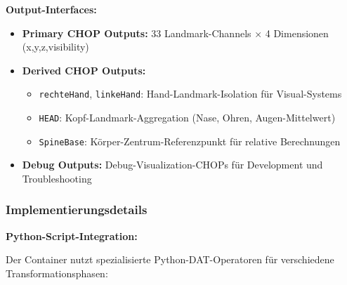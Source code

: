 \textbf{Output-Interfaces:}
\begin{itemize}
    \item \textbf{Primary CHOP Outputs:} 33 Landmark-Channels × 4 Dimensionen (x,y,z,visibility)
    \item \textbf{Derived CHOP Outputs:} 
    \begin{itemize}
        \item \texttt{rechteHand}, \texttt{linkeHand}: Hand-Landmark-Isolation für Visual-Systems
        \item \texttt{HEAD}: Kopf-Landmark-Aggregation (Nase, Ohren, Augen-Mittelwert)
        \item \texttt{SpineBase}: Körper-Zentrum-Referenzpunkt für relative Berechnungen
    \end{itemize}
    \item \textbf{Debug Outputs:} Debug-Visualization-CHOPs für Development und Troubleshooting
\end{itemize}

\subsubsection{Implementierungsdetails}

\textbf{Python-Script-Integration:}

Der Container nutzt spezialisierte Python-DAT-Operatoren für verschiedene Transformationsphasen:


